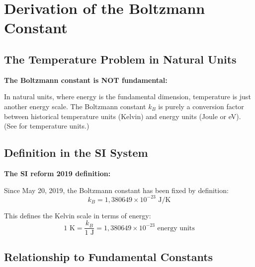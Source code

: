 	\section{Derivation of the Boltzmann Constant}
	
	\subsection{The Temperature Problem in Natural Units}
	
	\begin{warning}
		\textbf{The Boltzmann constant is NOT fundamental:}
		
		In natural units, where energy is the fundamental dimension, temperature is just another energy scale. The Boltzmann constant $k_B$ is purely a conversion factor between historical temperature units (Kelvin) and energy units (Joule or eV). (See \cite{temperature_units_CMB_En} for temperature units.)
	\end{warning}
	
	\subsection{Definition in the SI System}
	
	\begin{derivation}
		\textbf{The SI reform 2019 definition:}
		
		Since May 20, 2019, the Boltzmann constant has been fixed by definition:
		\begin{equation}
			\boxed{k_B = 1{,}380649 \times 10^{-23} \text{ J/K}}
			\label{eq:kb_si}
		\end{equation}
		
		This defines the Kelvin scale in terms of energy:
		\begin{equation}
			1 \text{ K} = \frac{k_B}{1 \text{ J}} = 1{,}380649 \times 10^{-23} \text{ energy units}
		\end{equation}
	\end{derivation}
	
	\subsection{Relationship to Fundamental Constants}
	
